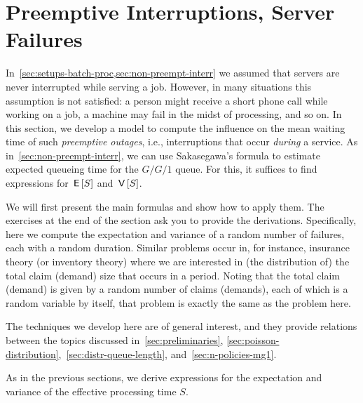 \section{Preemptive Interruptions, Server Failures}
\label{sec:preempt-interr-serv}

In~\cref{sec:setups-batch-proc,sec:non-preempt-interr} we assumed that servers are never interrupted while serving a job.
However, in many situations this assumption is not satisfied: a person might receive a short phone call while working on a job, a machine may fail in the midst of processing, and so on.
In this section, we develop a model to compute the influence on the mean waiting time of such \emph{preemptive outages}, i.e., interruptions that occur \emph{during} a service.
As in~\cref{sec:non-preempt-interr}, we can use Sakasegawa's formula to estimate expected queueing time for the $G/G/1$ queue.
For this, it suffices to find expressions for $\,\mathsf{E}\left[S\right]$ and $\,\mathsf{V}\left[S\right]$.

We will first present the main formulas and show how to apply them.
The exercises at the end of the section ask you to provide the derivations.
Specifically, here we compute the expectation and variance of a random number of failures, each with a random duration.
Similar problems occur in, for instance, insurance theory (or inventory theory) where we are interested in (the distribution of) the total claim (demand) size that occurs in a period.
Noting that the total claim (demand) is given by a random number of claims (demands), each of which is a random variable by itself, that problem is exactly the same as the problem here.

The techniques we develop here are of general interest, and they provide relations between the topics discussed in~\cref{sec:preliminaries}, \cref{sec:poisson-distribution},~\cref{sec:distr-queue-length}, and~\cref{sec:n-policies-mg1}.



As in the previous sections, we derive expressions for the expectation and variance of the effective processing time $S$. 

